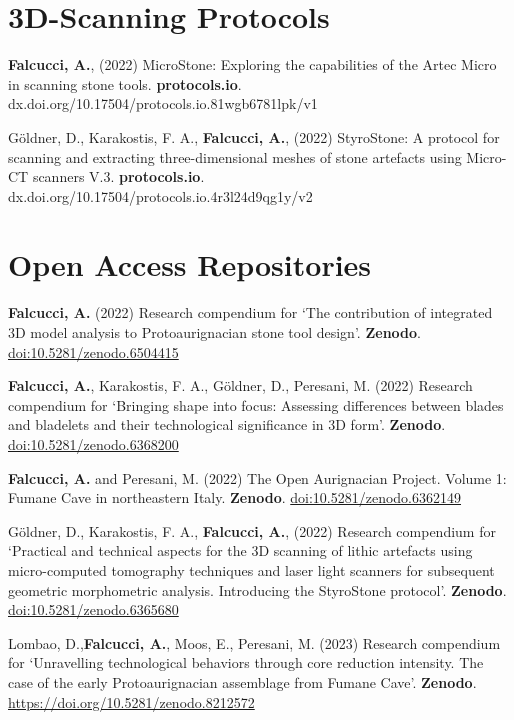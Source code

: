 \documentclass[11pt,a4paper,]{awesome-cv}
\begin{document}
\hypertarget{d-scanning-protocols}{%
\section{3D-Scanning Protocols}\label{d-scanning-protocols}}

\textbf{Falcucci, A.}, (2022) MicroStone: Exploring the capabilities of
the Artec Micro in scanning stone tools. \textbf{protocols.io}.
dx.doi.org/10.17504/protocols.io.81wgb6781lpk/v1

Göldner, D., Karakostis, F. A., \textbf{Falcucci, A.}, (2022)
StyroStone: A protocol for scanning and extracting three-dimensional
meshes of stone artefacts using Micro-CT scanners V.3.
\textbf{protocols.io}. dx.doi.org/10.17504/protocols.io.4r3l24d9qg1y/v2

\setlength{\leftskip}{0cm}

\hypertarget{open-access-repositories}{%
\section{Open Access Repositories}\label{open-access-repositories}}

\textbf{Falcucci, A.} (2022) Research compendium for `The contribution
of integrated 3D model analysis to Protoaurignacian stone tool design'.
\textbf{Zenodo}. \url{doi:10.5281/zenodo.6504415}

\textbf{Falcucci, A.}, Karakostis, F. A., Göldner, D., Peresani, M.
(2022) Research compendium for `Bringing shape into focus: Assessing
differences between blades and bladelets and their technological
significance in 3D form'. \textbf{Zenodo}.
\url{doi:10.5281/zenodo.6368200}

\textbf{Falcucci, A.} and Peresani, M. (2022) The Open Aurignacian
Project. Volume 1: Fumane Cave in northeastern Italy. \textbf{Zenodo}.
\url{doi:10.5281/zenodo.6362149}

Göldner, D., Karakostis, F. A., \textbf{Falcucci, A.}, (2022) Research
compendium for `Practical and technical aspects for the 3D scanning of
lithic artefacts using micro-computed tomography techniques and laser
light scanners for subsequent geometric morphometric analysis.
Introducing the StyroStone protocol'. \textbf{Zenodo}.
\url{doi:10.5281/zenodo.6365680}

Lombao, D.,\textbf{Falcucci, A.}, Moos, E., Peresani, M. (2023) Research
compendium for `Unravelling technological behaviors through core
reduction intensity. The case of the early Protoaurignacian assemblage
from Fumane Cave'. \textbf{Zenodo}.
\url{https://doi.org/10.5281/zenodo.8212572}
\end{document}

